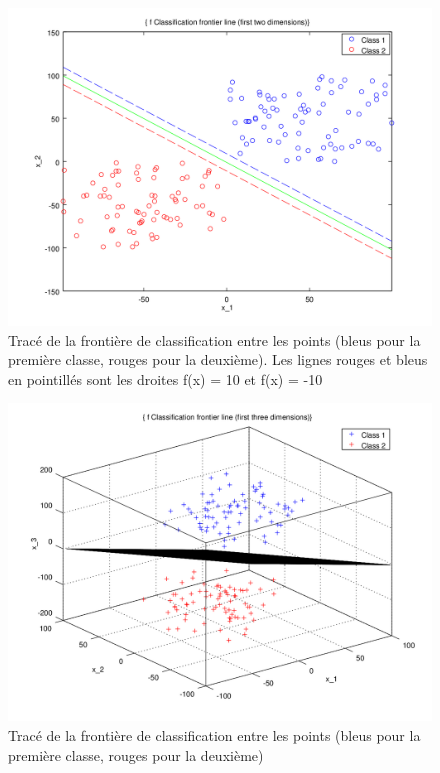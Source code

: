 \documentclass{article}
\begin{document}
         \begin{figure}
           \begin{center}
             \subfigure\includegraphics[scale=0.5]{images/line4.png}
             \caption{Tracé de la frontière de classification entre les points (bleus pour la première classe, rouges pour la deuxième). Les lignes rouges et bleus en pointillés sont les droites f(x) = 10 et f(x) = -10}
           \end{center}
         \end{figure}

         \begin{figure}
           \begin{center}
             \subfigure\includegraphics[scale=0.5]{images/plane4.png}
             \caption{Tracé de la frontière de classification entre les points (bleus pour la première classe, rouges pour la deuxième)}
           \end{center}
         \end{figure}
\end{document}

